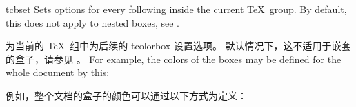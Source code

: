 \begin{docCommand}{tcbset}{}
Sets options for every following  inside the current \TeX\ group.
By default, this does not apply to nested boxes, see .

为当前的 \TeX\ 组中为后续的 {tcolorbox} 设置选项。 默认情况下，这不适用于嵌套的盒子，请参见 。\parpar
For example, the colors of the boxes may be defined for the whole document by this:


例如，整个文档的盒子的颜色可以通过以下方式为定义：
  
\begin{dispListing}
\end{dispListing}
\end{docCommand}